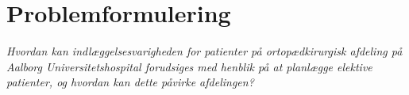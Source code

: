 \section{Problemformulering}
\textit{Hvordan kan indlæggelsesvarigheden for patienter på ortopædkirurgisk afdeling på Aalborg Universitetshospital forudsiges med henblik på at planlægge elektive patienter, og hvordan kan dette påvirke afdelingen?}